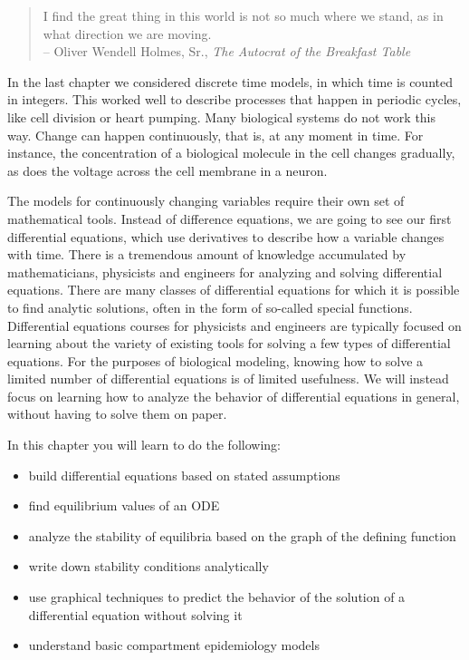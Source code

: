 \documentclass[
  letterpaper,
  DIV=11,
  numbers=noendperiod]{scrreprt}
\begin{document}

\begin{quote}
I find the great thing in this world is not so much where we stand, as
in what direction we are moving.\\
-- Oliver Wendell Holmes, Sr., \emph{The Autocrat of the Breakfast
Table}
\end{quote}

In the last chapter we considered discrete time models, in which time is
counted in integers. This worked well to describe processes that happen
in periodic cycles, like cell division or heart pumping. Many biological
systems do not work this way. Change can happen continuously, that is,
at any moment in time. For instance, the concentration of a biological
molecule in the cell changes gradually, as does the voltage across the
cell membrane in a neuron.

The models for continuously changing variables require their own set of
mathematical tools. Instead of difference equations, we are going to see
our first differential equations, which use derivatives to describe how
a variable changes with time. There is a tremendous amount of knowledge
accumulated by mathematicians, physicists and engineers for analyzing
and solving differential equations. There are many classes of
differential equations for which it is possible to find analytic
solutions, often in the form of so-called special functions.
Differential equations courses for physicists and engineers are
typically focused on learning about the variety of existing tools for
solving a few types of differential equations. For the purposes of
biological modeling, knowing how to solve a limited number of
differential equations is of limited usefulness. We will instead focus
on learning how to analyze the behavior of differential equations in
general, without having to solve them on paper.

In this chapter you will learn to do the following:

\begin{itemize}
\item
  build differential equations based on stated assumptions
\item
  find equilibrium values of an ODE
\item
  analyze the stability of equilibria based on the graph of the defining
  function
\item
  write down stability conditions analytically
\item
  use graphical techniques to predict the behavior of the solution of a
  differential equation without solving it
\item
  understand basic compartment epidemiology models
\end{itemize}
\end{document}
